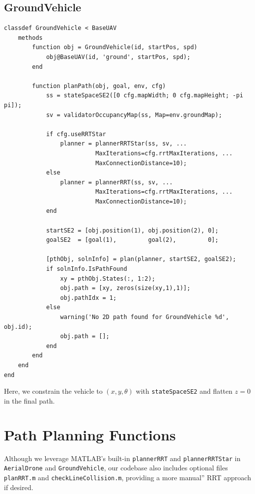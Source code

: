 \documentclass[12pt,a4paper]{report}
\begin{document}
\subsection{GroundVehicle}
\label{sec:ground_vehicle}
\begin{verbatim}
classdef GroundVehicle < BaseUAV
    methods
        function obj = GroundVehicle(id, startPos, spd)
            obj@BaseUAV(id, 'ground', startPos, spd);
        end

        function planPath(obj, goal, env, cfg)
            ss = stateSpaceSE2([0 cfg.mapWidth; 0 cfg.mapHeight; -pi pi]);
            sv = validatorOccupancyMap(ss, Map=env.groundMap);

            if cfg.useRRTStar
                planner = plannerRRTStar(ss, sv, ...
                          MaxIterations=cfg.rrtMaxIterations, ...
                          MaxConnectionDistance=10);
            else
                planner = plannerRRT(ss, sv, ...
                          MaxIterations=cfg.rrtMaxIterations, ...
                          MaxConnectionDistance=10);
            end

            startSE2 = [obj.position(1), obj.position(2), 0];
            goalSE2  = [goal(1),         goal(2),         0];

            [pthObj, solnInfo] = plan(planner, startSE2, goalSE2);
            if solnInfo.IsPathFound
                xy = pthObj.States(:, 1:2);
                obj.path = [xy, zeros(size(xy,1),1)];
                obj.pathIdx = 1;
            else
                warning('No 2D path found for GroundVehicle %d', obj.id);
                obj.path = [];
            end
        end
    end
end
\end{verbatim}
Here, we constrain the vehicle to \((x,y,\theta)\) with \texttt{stateSpaceSE2} 
and flatten $z=0$ in the final path.

\section{Path Planning Functions}
\label{sec:path_planning}

Although we leverage MATLAB's built-in \texttt{plannerRRT} and \texttt{plannerRRTStar} 
in \texttt{AerialDrone} and \texttt{GroundVehicle}, our codebase also includes optional 
files \texttt{planRRT.m} and \texttt{checkLineCollision.m}, providing a more 
manual'' RRT approach if desired.
\end{document}
